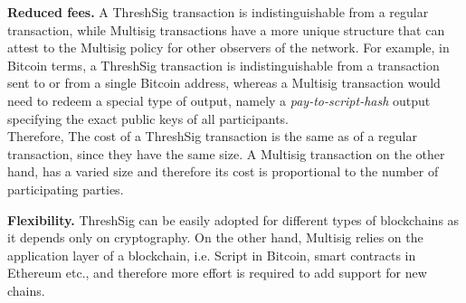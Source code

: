 \documentclass[runningheads]{llncs}
\begin{document}
\textbf{Reduced fees.} A ThreshSig transaction is indistinguishable from a regular transaction, while Multisig transactions have a more unique structure that can attest to the Multisig policy for other observers of the network. For example, in Bitcoin terms, a ThreshSig transaction is indistinguishable from a transaction sent to or from a single Bitcoin address, whereas a Multisig transaction would need to redeem a special type of output, namely a \textit{pay-to-script-hash} output specifying the exact public keys of all participants.\\
Therefore, The cost of a ThreshSig transaction is the same as of a regular transaction, since they have the same size. A Multisig transaction on the other hand, has a varied size and therefore its cost is proportional to the number of participating parties.

\textbf{Flexibility.} ThreshSig can be easily adopted for different types of blockchains as it depends only on cryptography. On the other hand, Multisig relies on the application layer of a blockchain, i.e. Script in Bitcoin, smart contracts in Ethereum etc., and therefore more effort is required to add support for new chains.
\end{document}
